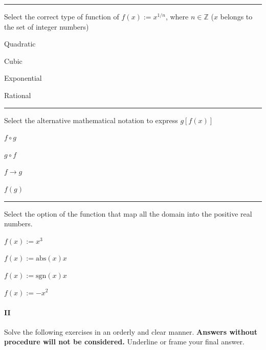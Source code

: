 \begin{preguntas}
\pregunta[5] \rule{1cm}{0.1mm} Select the correct type of function of $f(x):=x^{1/n}$, where $n\in\mathbb{Z}$ ($x$ belongs to the set of integer numbers)

\begin{enumerate*}[label=(\alph*)]
    \item Quadratic$\qquad$
    \item Cubic$\qquad$
    \item Exponential$\qquad$
    \item Rational$\qquad$
\end{enumerate*}

\pregunta[5] \rule{1cm}{0.1mm} Select the alternative mathematical notation to express $g[f(x)]$

\begin{enumerate*}[label=(\alph*)]
    \item $f\circ g\qquad$
    \item $g\circ f\qquad$
    \item $f\to g\qquad$
    \item $f(g)\qquad$
\end{enumerate*}

\pregunta[5] \rule{1cm}{0.1mm} Select the option of the function that map all the domain into the positive real numbers.

\begin{enumerate*}[label=(\alph*)]
    \item $f(x):=x^3\qquad$
    \item $f(x):=\mathrm{abs}(x)x\qquad$
    \item $f(x):=\mathrm{sgn}(x) x\qquad$
    \item $f(x):=-x^2\qquad$
\end{enumerate*}


\end{preguntas}

\newpage

\paragraph{II} Solve the following exercises in an orderly and clear manner. 
\textbf{Answers without procedure will not be considered.}
Underline or frame your final answer.


